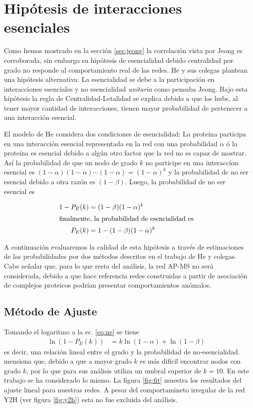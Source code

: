 \section{Hip\'otesis de interacciones esenciales~\citep{he2006}}
Como hemos mostrado en la secci\'on \ref{sec:jeong} la correlaci\'on vista por Jeong es corroborada, sin embargo su hip\'otesis
de esencialidad debido centralidad por grado no responde al comportamiento real de las redes. He y sus colegas plantean una
hip\'otesis alternativa: La esencialidad se debe a la participaci\'on en interacciones esenciales y no esencialidad 
\textit{unitaria} como pensaba Jeong. Bajo esta hip\'otesis la regla de Centralidad-Letalidad se explica debido a que 
los hubs, al tener mayor cantidad de interacciones, tienen mayor probabilidad de pertenecer a una interacci\'on esencial.

El modelo de He considera dos condiciones de esencialidad: La prote\'ina participa en una interacci\'on esencial representada
en la red con una probabilidad $\alpha$ \'o la prote\'ina es esencial debido a alg\'un otro factor que la red no es capaz de
mostrar. As\'i la probabilidad de que un nodo de grado $k$ no participe en una interacc\'ion esencial es 
$(1-\alpha)(1-\alpha)\cdots(1-\alpha) = (1-\alpha)^k$ y la probabilidad de no ser esencial debido a otra raz\'on es $(1-\beta)$.
Luego, la probabilidad de no ser esencial es

\begin{align}
    \label{eq:ne}
    1-P_E(k) &= (1-\beta)(1-\alpha)^k\\
    \intertext{finalmente, la probabilidad de esencialidad es}
    P_E(k) &= 1 - (1-\beta)(1-\alpha)^k
\end{align}


A continuaci\'on evaluaremos la calidad de esta hip\'otesis a trav\'es de estimaciones de las probabilidades por dos m\'etodos 
descritos en el trabajo de He y colegas. Cabe se\~nalar que, para lo que resta del an\'alisis, la red AP-MS no ser\'a considerada,
debido a que \citet{he2006} hace referencia redes construidas a partir de asociaci\'on de complejos proteicos podr\'ian 
presentar comportamientos an\'omalos.

\subsection{M\'etodo de Ajuste}
Tomando el logaritmo a la ec. \ref{eq:ne} se tiene 
\begin{align}
    \ln(1-P_E(k)) &= k \ln(1-\alpha) + \ln(1-\beta)
\end{align}
es decir, una relaci\'on lineal entre el grado y la probabilidad de no-esencialidad. \citet{he2006} mensiona que, debido a que
a mayor grado $k$ es m\'as dificil encontrar nodos con grado $k$, por lo que para sus an\'alisis utiliza un umbral superior de
$k=10$. En este trabajo se ha considerado lo mismo. La figura \ref{fig:fit} muestra los resultados del ajuste lineal para 
nuestras redes. A pesar del comportamineto irregular de la red Y2H (ver figura \ref{fig:y2h}) esta no fue excluida del an\'alisis.

